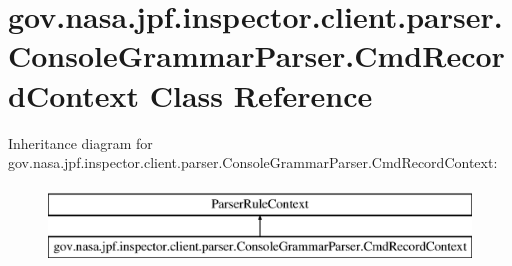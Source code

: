 \hypertarget{classgov_1_1nasa_1_1jpf_1_1inspector_1_1client_1_1parser_1_1_console_grammar_parser_1_1_cmd_record_context}{}\section{gov.\+nasa.\+jpf.\+inspector.\+client.\+parser.\+Console\+Grammar\+Parser.\+Cmd\+Record\+Context Class Reference}
\label{classgov_1_1nasa_1_1jpf_1_1inspector_1_1client_1_1parser_1_1_console_grammar_parser_1_1_cmd_record_context}
Inheritance diagram for gov.\+nasa.\+jpf.\+inspector.\+client.\+parser.\+Console\+Grammar\+Parser.\+Cmd\+Record\+Context\+:\begin{figure}[H]
\begin{center}
\leavevmode
\includegraphics[height=2.000000cm]{classgov_1_1nasa_1_1jpf_1_1inspector_1_1client_1_1parser_1_1_console_grammar_parser_1_1_cmd_record_context}
\end{center}
\end{figure}
